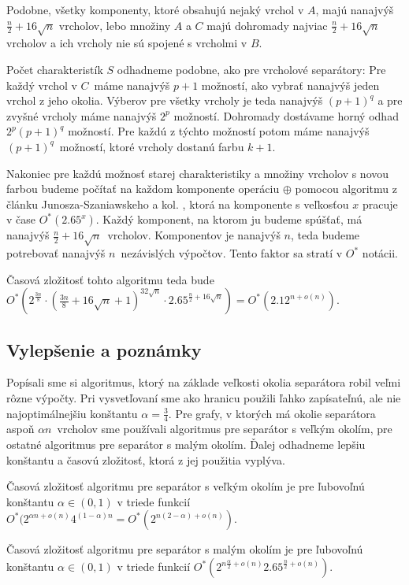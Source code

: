 Podobne, všetky komponenty, ktoré obsahujú nejaký vrchol v $A$, majú nanajvýš $\frac{n}{2} + 16 \sqrt{n}$
vrcholov, lebo množiny $A$ a $C$ majú dohromady najviac $\frac{n}{2} + 16 \sqrt{n}$ vrcholov a ich vrcholy
nie sú spojené s vrcholmi v $B$.

Počet charakteristík $S$ odhadneme podobne, ako pre vrcholové separátory: Pre každý vrchol v $C$ máme
nanajvýš $p+1$ možností, ako vybrať nanajvýš jeden vrchol z jeho okolia. Výberov pre všetky vrcholy je
teda nanajvýš $(p+1)^q$ a pre zvyšné vrcholy máme nanajvýš $2^p$ možností. Dohromady dostávame horný
odhad $2^p (p+1)^q$ možností. Pre každú z týchto možností potom máme nanajvýš $(p+1)^q$ možností, ktoré
vrcholy dostanú farbu $k+1$.

Nakoniec pre každú možnosť starej charakteristiky a množiny vrcholov s novou farbou budeme počítať
na každom komponente operáciu $\oplus$ pomocou algoritmu z článku Junosza-Szaniawskeho a kol. \cite{junosza_fast},
ktorá na komponente s veľkosťou $x$ pracuje v čase $O^*(2.65^x)$. Každý komponent, na ktorom ju budeme
spúšťať, má nanajvýš $\frac{n}{2} + 16\sqrt{n}$ vrcholov. Komponentov je nanajvýš $n$, teda budeme
potrebovať nanajvýš $n$ nezávislých výpočtov. Tento faktor sa stratí v $O^*$ notácii.

Časová zložitosť tohto algoritmu teda bude $O^*\left(2^{\frac{3n}{8}} \cdot (\frac{3n}{8} + 16 \sqrt{n} + 1)^{32 \sqrt{n}} \cdot 2.65^{\frac{n}{2} + 16 \sqrt{n}}\right) = O^*\left(2.12^{n + o(n)}\right)$.

\subsection{Vylepšenie a poznámky}

Popísali sme si algoritmus, ktorý na základe veľkosti okolia separátora robil veľmi rôzne výpočty.
Pri vysvetľovaní sme ako hranicu použili ľahko zapísateľnú, ale nie najoptimálnejšiu konštantu
$\alpha = \frac{3}{4}$. Pre grafy, v ktorých má okolie separátora aspoň $\alpha n$ vrcholov
sme používali algoritmus pre separátor s veľkým okolím, pre ostatné algoritmus pre separátor
s malým okolím. Ďalej odhadneme lepšiu konštantu a časovú zložitosť, ktorá z jej použitia vyplýva.

Časová zložitosť algoritmu pre separátor s veľkým okolím je pre ľubovoľnú konštantu $\alpha \in (0, 1)$
v triede funkcií $O^*(2^{\alpha n + o(n)}4^{(1 - \alpha) n} = O^*(2^{n(2 - \alpha) + o(n)})$.

Časová zložitosť algoritmu pre separátor s malým okolím je pre ľubovoľnú konštantu $\alpha \in (0,1)$
v triede funkcií $O^*(2^{n\frac{\alpha}{2} + o(n)} 2.65^{\frac{n}{2} + o(n)})$.

